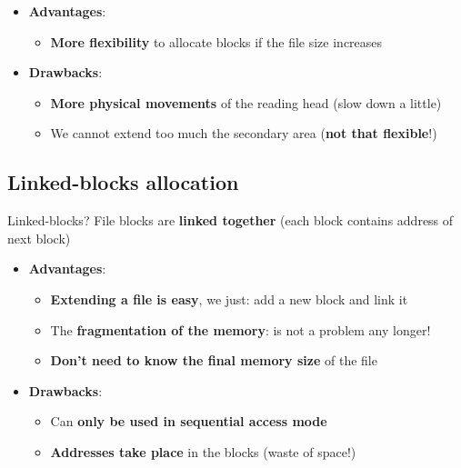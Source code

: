 \documentclass{beamer}[10pt, usepdftitle=false, handout]
\begin{document}
{\begin{frame}
	\begin{itemize}
	
	\item{\textbf{Advantages}:
		\begin{itemize}
			\item{\textbf{More flexibility} to allocate blocks if the file size increases}
		\end{itemize}			
	}\vspace*{0.5em}
	
	
	\item{\textbf{Drawbacks}: 
		\begin{itemize}
			\item{\textbf{More physical movements} of the reading head (slow down a little)}
			\item{We cannot extend too much the secondary area (\textbf{not that flexible}!)}
		\end{itemize}			
	}	
	
	\end{itemize}		
	
	
	\end{frame}
	
	\subsection{Linked-blocks allocation}	
	
	\begin{frame}
	
	\begin{block}{Linked-blocks?}
	File blocks are \textbf{linked together} (each block contains address of next block)\footnotemark[4]	
	\end{block}
	\vspace*{1em}		
		
	\begin{itemize}
	
	\item{\textbf{Advantages}: 
		\begin{itemize}
			\item {\textbf{Extending a file is easy}, we just: add a new block and link it}
			\item {The \textbf{fragmentation of the memory}: is not a problem any longer!}
			\item {\textbf{Don't need to know the final memory size} of the file}		
		\end{itemize}			
	}
	\vspace*{0.5em}
	
	\item{\textbf{Drawbacks}:
		\begin{itemize}
		\item{Can \textbf{only be used in sequential access mode}}
		\item{\textbf{Addresses take place} in the blocks (waste of space!)}
		\end{itemize}
	}	
	

\end{itemize}
\end{frame}}
\end{document}
